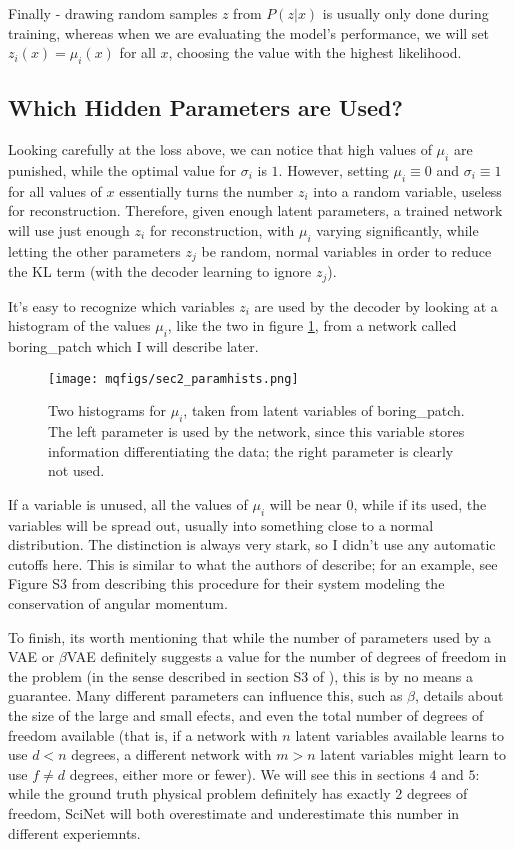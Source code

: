 \documentclass[aps,prl,preprint,groupedaddress]{revtex4-1}
\begin{document}
Finally - drawing random samples $z$ from $P(z | x)$ is usually only done during training, whereas when we are evaluating the model's performance, we will set $z_i(x) = \mu_i(x)$ for all $x$, choosing the value with the highest likelihood.

\subsection{ Which Hidden Parameters are Used?}

Looking carefully at the loss above, we can notice that high values of $\mu_i$ are punished, while the optimal value for $\sigma_i$ is $1$. However, setting $\mu_i \equiv 0$ and $\sigma_i \equiv 1$ for all values of $x$ essentially turns the number $z_i$ into a random variable, useless for reconstruction. Therefore, given enough latent parameters, a trained network will use just enough $z_i$ for reconstruction, with $\mu_i$ varying significantly, while letting the other parameters $z_j$ be random, normal variables in order to reduce the KL term (with the decoder learning to ignore $z_j$).

It's easy to recognize which variables $z_i$ are used by the decoder by looking at a histogram of the values $\mu_i$, like the two in figure \ref{howchoose}, from a network called boring\_patch which I will describe later.

\begin{figure}[h]
   \centering
   \texttt{[image: mqfigs/sec2\_paramhists.png]}
   \caption{\label{howchoose} Two histograms for $\mu_i$, taken from latent variables of boring\_patch. The left parameter is used by the network, since this variable stores information differentiating the data; the right parameter is clearly not used.}
\end{figure}

If a variable is unused, all the values of $\mu_i$ will be near $0$, while if its used, the variables will be spread out, usually into something close to a normal distribution. The distinction is always very stark, so I didn't use any automatic cutoffs here. This is similar to what the authors of \cite{iten2020} describe; for an example, see Figure S3 from \cite{iten2020supplement} describing this procedure for their system modeling the conservation of angular momentum.

To finish, its worth mentioning that while the number of parameters used by a VAE or $\beta$VAE definitely suggests a value for the number of degrees of freedom in the problem (in the sense described in section S3 of \cite{iten2020supplement}), this is by no means a guarantee. Many different parameters can influence this, such as $\beta$, details about the size of the large and small efects, and even the total number of degrees of freedom available (that is, if a network with $n$ latent variables available learns to use $d < n$ degrees, a different network with $m > n$ latent variables might learn to use $f \not= d$ degrees, either more or fewer). We will see this in sections $4$ and $5$: while the ground truth physical problem definitely has exactly $2$ degrees of freedom, SciNet will both overestimate and underestimate this number in different experiemnts.
\end{document}
